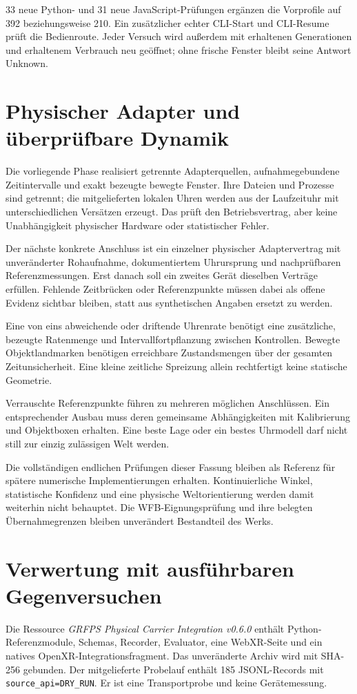 \documentclass[11pt,a4paper]{article}
\newcommand{\nextsection}[2]{\clearpage{\color{accent}\small\textsf{#1}}\section{#2}}
\begin{document}
33 neue Python- und 31 neue JavaScript-Prüfungen ergänzen die
Vorprofile auf 392 beziehungsweise 210. Ein zusätzlicher echter
CLI-Start und CLI-Resume prüft die Bedienroute. Jeder Versuch
wird außerdem mit erhaltenen Generationen und erhaltenem Verbrauch
neu geöffnet; ohne frische Fenster bleibt seine Antwort Unknown.

\nextsection{82 / NÄCHSTE STUFE}{Physischer Adapter und überprüfbare Dynamik}
Die vorliegende Phase realisiert getrennte Adapterquellen,
aufnahmegebundene Zeitintervalle und exakt bezeugte bewegte Fenster.
Ihre Dateien und Prozesse sind getrennt; die mitgelieferten
lokalen Uhren werden aus der Laufzeituhr mit unterschiedlichen
Versätzen erzeugt. Das prüft den Betriebsvertrag, aber keine
Unabhängigkeit physischer Hardware oder statistischer Fehler.

Der nächste konkrete Anschluss ist ein einzelner physischer
Adaptervertrag mit unveränderter Rohaufnahme, dokumentiertem
Uhrursprung und nachprüfbaren Referenzmessungen. Erst danach soll
ein zweites Gerät dieselben Verträge erfüllen. Fehlende
Zeitbrücken oder Referenzpunkte müssen dabei als offene Evidenz
sichtbar bleiben, statt aus synthetischen Angaben ersetzt zu werden.

Eine von eins abweichende oder driftende Uhrenrate benötigt eine
zusätzliche, bezeugte Ratenmenge und Intervallfortpflanzung zwischen
Kontrollen. Bewegte Objektlandmarken benötigen erreichbare Zustandsmengen
über der gesamten Zeitunsicherheit. Eine kleine zeitliche Spreizung
allein rechtfertigt keine statische Geometrie.

Verrauschte Referenzpunkte führen zu mehreren möglichen Anschlüssen.
Ein entsprechender Ausbau muss deren gemeinsame Abhängigkeiten
mit Kalibrierung und Objektboxen erhalten. Eine beste Lage oder ein
bestes Uhrmodell darf nicht still zur einzig zulässigen Welt werden.

Die vollständigen endlichen Prüfungen dieser Fassung bleiben
als Referenz für spätere numerische Implementierungen erhalten.
Kontinuierliche Winkel, statistische Konfidenz und eine
physische Weltorientierung werden damit weiterhin nicht behauptet.
Die WFB-Eignungsprüfung und ihre belegten Übernahmegrenzen
bleiben unverändert Bestandteil des Werks.

\nextsection{83 / RESSOURCENPRÜFUNG}{Verwertung mit ausführbaren Gegenversuchen}
Die Ressource \emph{GRFPS Physical Carrier Integration v0.6.0}
enthält Python-Referenzmodule, Schemas, Recorder, Evaluator,
eine WebXR-Seite und ein natives OpenXR-Integrationsfragment.
Das unveränderte Archiv wird mit SHA-256 gebunden. Der mitgelieferte
Probelauf enthält 185 JSONL-Records mit \texttt{source\_api=DRY\_RUN}.
Er ist eine Transportprobe und keine Gerätemessung.
\end{document}

